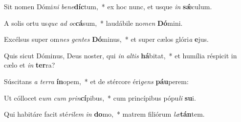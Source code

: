 \item Sit nomen Dómi\textit{ni} \textit{be}\textit{ne}\textbf{díc}tum,~* ex hoc nunc, et usque \textit{in} \textbf{sǽ}culum.
\item A solis ortu us\textit{que} \textit{ad} \textit{oc}\textbf{cá}sum,~* laudábile no\textit{men} \textbf{Dó}mini.
\item Excélsus super om\textit{nes} \textit{gen}\textit{tes} \textbf{Dó}minus,~* et super cælos glóri\textit{a} \textbf{e}jus.
\item Quis sicut Dóminus, Deus noster, qui \textit{in} \textit{al}\textit{tis} \textbf{há}bitat,~* et humília réspicit in cælo et \textit{in} \textbf{ter}ra?
\item Súscitans \textit{a} \textit{ter}\textit{ra} \textbf{ín}opem,~* et de stércore éri\textit{gens} \textbf{páu}perem:
\item Ut cóllocet e\textit{um} \textit{cum} \textit{prin}\textbf{cí}pibus,~* cum princípibus pópu\textit{li} \textbf{su}i.
\item Qui habitáre facit sté\textit{ri}\textit{lem} \textit{in} \textbf{do}mo,~* matrem filiórum \textit{læ}\textbf{tán}tem.
